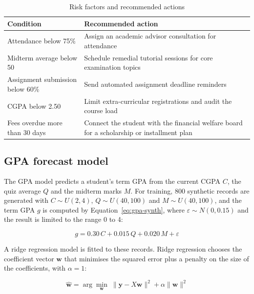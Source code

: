 \begin{table}[H]
    \centering
        \caption{Risk factors and recommended actions}
        \label{tab:risk-factors}
        \begin{tabular}{|p{4.2cm}|p{8.8cm}|}
        \hline
        \textbf{Condition} & \textbf{Recommended action}\\
        \hline
        Attendance below 75\% & Assign an academic advisor consultation for attendance \\
        \hline
        Midterm average below 50 & Schedule remedial tutorial sessions for core examination topics \\
        \hline
        Assignment submission below 60\% & Send automated assignment deadline reminders \\
        \hline
        CGPA below 2.50 & Limit extra-curricular registrations and audit the course load \\
        \hline
        Fees overdue more than 30 days & Connect the student with the financial welfare board for a scholarship or installment plan \\
        \hline
        \end{tabular}
\end{table}

\subsection{GPA forecast model}
The GPA model predicts a student's term GPA from the current CGPA $C$, the quiz average $Q$ and the midterm marks $M$. For training, 800 synthetic records are generated with $C \sim U(2,4)$, $Q \sim U(40,100)$ and $M \sim U(40,100)$, and the term GPA $g$ is computed by Equation~\ref{eq:gpa-synth}, where $\varepsilon \sim N(0, 0.15)$ and the result is limited to the range 0 to 4:

\begin{equation} \label{eq:gpa-synth}
    g = 0.30\,C + 0.015\,Q + 0.020\,M + \varepsilon
\end{equation}

A ridge regression model is fitted to these records. Ridge regression chooses the coefficient vector $\mathbf{w}$ that minimises the squared error plus a penalty on the size of the coefficients, with $\alpha = 1$:

\begin{equation} \label{eq:ridge}
    \hat{\mathbf{w}} = \arg\min_{\mathbf{w}} \; \lVert \mathbf{y} - X\mathbf{w} \rVert^2 + \alpha \lVert \mathbf{w} \rVert^2
\end{equation}

